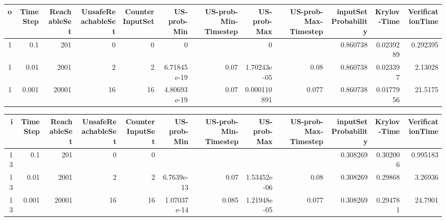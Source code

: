 \begin{tabular}{rrrrrrrrrrrr}
\hline
   o &   TimeStep &   ReachableSet &   UnsafeReachableSet &   CounterInputSet &   US-prob-Min &   US-prob-Min-Timestep &   US-prob-Max &   US-prob-Max-Timestep &   inputSet Probability &   Krylov-Time &   VerificationTime \\
\hline
   1 &      0.1   &            201 &                    0 &                 0 &   0           &                        &   0           &                        &               0.860738 &     0.0239289 &           0.292395 \\
   1 &      0.01  &           2001 &                    2 &                 2 &   6.71845e-19 &                   0.07 &   1.70243e-05 &                  0.08  &               0.860738 &     0.023397  &           2.13028  \\
   1 &      0.001 &          20001 &                   16 &                16 &   4.80693e-19 &                   0.07 &   0.000110891 &                  0.077 &               0.860738 &     0.0177956 &          21.5175   \\
\hline
\end{tabular}

\begin{tabular}{rrrrrrrrrrrr}
\hline
   i &   TimeStep &   ReachableSet &   UnsafeReachableSet &   CounterInputSet &   US-prob-Min &   US-prob-Min-Timestep &   US-prob-Max &   US-prob-Max-Timestep &   inputSet Probability &   Krylov-Time &   VerificationTime \\
\hline
  13 &      0.1   &            201 &                    0 &                 0 &               &                        &               &                        &               0.308269 &      0.302006 &           0.995183 \\
  13 &      0.01  &           2001 &                    2 &                 2 &   6.7639e-13  &                  0.07  &   1.53452e-06 &                  0.08  &               0.308269 &      0.29868  &           3.26936  \\
  13 &      0.001 &          20001 &                   16 &                16 &   1.07037e-14 &                  0.085 &   1.21948e-05 &                  0.077 &               0.308269 &      0.294781 &          24.7901   \\
\hline
\end{tabular}




